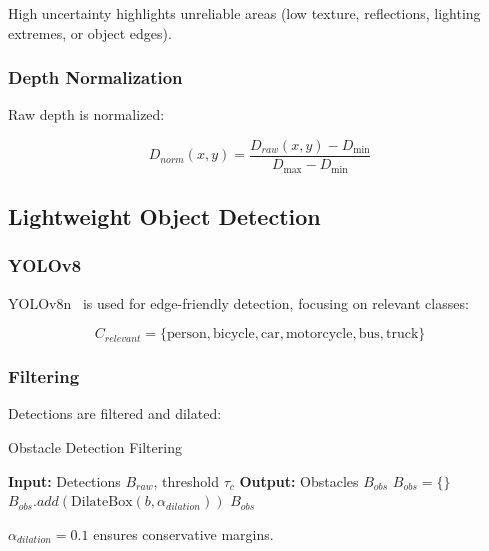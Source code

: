 \documentclass[12pt,oneside]{book}
\begin{document}
High uncertainty highlights unreliable areas (low texture, reflections, lighting extremes, or object edges).

\subsubsection{Depth Normalization}

Raw depth is normalized:

\begin{equation}
D_{norm}(x,y) = \frac{D_{raw}(x,y) - D_{\min}}{D_{\max} - D_{\min}}
\label{eq:depth_normalization}
\end{equation}

\subsection{Lightweight Object Detection}

\subsubsection{YOLOv8}

YOLOv8n~\cite{jocher2023ultralytics} is used for edge-friendly detection, focusing on relevant classes:

\begin{equation}
C_{relevant} = \{\text{person}, \text{bicycle}, \text{car}, \text{motorcycle}, \text{bus}, \text{truck}\}
\label{eq:relevant_classes}
\end{equation}

\subsubsection{Filtering}

Detections are filtered and dilated:

\begin{algorithm}
\caption{Obstacle Detection Filtering}
\begin{algorithmic}
\STATE \textbf{Input:} Detections $B_{raw}$, threshold $\tau_c$
\STATE \textbf{Output:} Obstacles $B_{obs}$
\STATE $B_{obs} = \{\}$
        \STATE $B_{obs}.add(\text{DilateBox}(b, \alpha_{dilation}))$
    \ENDIF
\ENDFOR
\RETURN $B_{obs}$
\end{algorithmic}
\end{algorithm}

$\alpha_{dilation} = 0.1$ ensures conservative margins.
\end{document}
